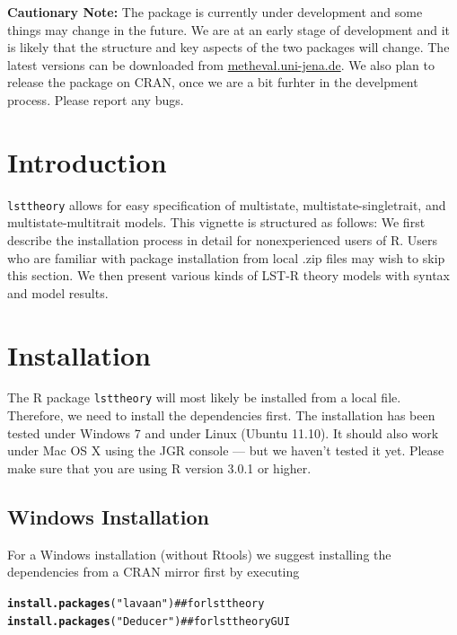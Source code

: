 \documentclass[10pt]{article}\usepackage{graphicx, color}
\makeatletter
\newcommand{\hlfunctioncall}[1]{\textcolor[rgb]{0.501960784313725,0,0.329411764705882}{\textbf{#1}}}%
\newcommand{\hlstring}[1]{\textcolor[rgb]{0.6,0.6,1}{#1}}%
\newenvironment{kframe}{%
 \def\at@end@of@kframe{}%
 \ifinner\ifhmode%
  \def\at@end@of@kframe{\end{minipage}}%
  \begin{minipage}{\columnwidth}%
 \fi\fi%
 \def\FrameCommand##1{\hskip\@totalleftmargin \hskip-\fboxsep
 \colorbox{shadecolor}{##1}\hskip-\fboxsep
     \hskip-\linewidth \hskip-\@totalleftmargin \hskip\columnwidth}%
 \MakeFramed {\advance\hsize-\width
   \@totalleftmargin\z@ \linewidth\hsize
   \@setminipage}}%
 {\par\unskip\endMakeFramed%
 \at@end@of@kframe}
\newenvironment{knitrout}{}{} %
\makeatother
\begin{document}
\textbf{Cautionary Note:} The package is currently under development and some things may change in the future. We are at an early stage of development and it is likely that the structure and key aspects of the two packages will change. The latest versions can be downloaded from \url{metheval.uni-jena.de}. We also plan to release the package on CRAN, once we are a bit furhter in the develpment process. Please report any bugs.




\newpage
\tableofcontents

\newpage



\section{Introduction} \label{sec:intro}

\texttt{lsttheory} allows for easy specification of multistate, multistate-singletrait, and multistate-multitrait models. This vignette is structured as follows: We first describe the installation process in detail for nonexperienced users of \textsf{R}. Users who are familiar with package installation from local .zip files may wish to skip this section. We then present various kinds of LST-R theory models with syntax and model results.



\section{Installation}

The \textsf{R} package \texttt{lsttheory} will most likely be installed from a local file. Therefore, we need to install the dependencies first. The installation has been tested under Windows 7 and under Linux (Ubuntu 11.10). It should also work under Mac OS X using the JGR console --- but we haven't tested it yet. Please make sure that you are using R version 3.0.1 or higher.

\subsection{Windows Installation}

For a Windows installation (without Rtools) we suggest installing the dependencies from a CRAN mirror first by executing
%
\begin{knitrout}
\color{fgcolor}\begin{kframe}
\begin{alltt}
\hlfunctioncall{install.packages}(\hlstring{"lavaan"})  ## for lsttheory
\hlfunctioncall{install.packages}(\hlstring{"Deducer"})  ## for lsttheoryGUI
\end{alltt}
\end{kframe}
\end{knitrout}
\end{document}
